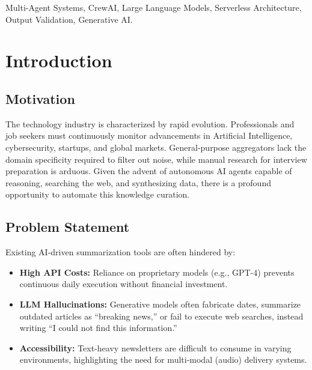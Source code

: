 \documentclass[conference]{IEEEtran}
\begin{document}
\begin{IEEEkeywords}
Multi-Agent Systems, CrewAI, Large Language Models, Serverless Architecture, Output Validation, Generative AI.
\end{IEEEkeywords}

\section{Introduction}

\subsection{Motivation}
The technology industry is characterized by rapid evolution. Professionals and job seekers must continuously monitor advancements in Artificial Intelligence, cybersecurity, startups, and global markets. General-purpose aggregators lack the domain specificity required to filter out noise, while manual research for interview preparation is arduous. Given the advent of autonomous AI agents capable of reasoning, searching the web, and synthesizing data, there is a profound opportunity to automate this knowledge curation.

\subsection{Problem Statement}
Existing AI-driven summarization tools are often hindered by:
\begin{itemize}
    \item \textbf{High API Costs:} Reliance on proprietary models (e.g., GPT-4) prevents continuous daily execution without financial investment.
    \item \textbf{LLM Hallucinations:} Generative models often fabricate dates, summarize outdated articles as ``breaking news,'' or fail to execute web searches, instead writing ``I could not find this information.''
    \item \textbf{Accessibility:} Text-heavy newsletters are difficult to consume in varying environments, highlighting the need for multi-modal (audio) delivery systems.
\end{itemize}
\end{document}
